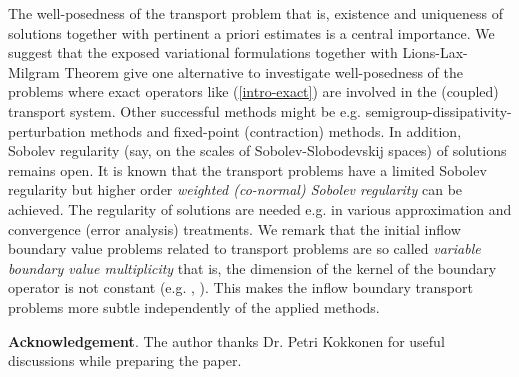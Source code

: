 \documentclass[a4paper,12pt,oneside,reqno]{amsart}
\theoremstyle{theorem}
\begin{document}
The well-posedness of the transport problem that is, existence and uniqueness of solutions together with pertinent a priori estimates is a central importance. 
We suggest that the exposed variational formulations together with Lions-Lax-Milgram Theorem give one alternative to investigate well-posedness of the problems where exact operators like (\ref{intro-exact}) are involved in the (coupled) transport system.  
Other successful  methods might be e.g. semigroup-dissipativity-perturbation  methods and fixed-point (contraction) methods. 
In addition,
Sobolev regularity (say, on the scales of Sobolev-Slobodevskij spaces) of solutions  remains  open.
It is known that the transport problems have a limited Sobolev regularity but higher order \emph{weighted (co-normal) Sobolev regularity} can be achieved.
The regularity of solutions are needed e.g. in various approximation and convergence (error analysis) treatments.
We remark that the initial inflow boundary value problems related to transport problems are so called \emph{variable boundary value multiplicity} that is, the dimension of the kernel of the boundary operator is not constant
(e.g. \cite{nishitani98}, \cite{rauch94}). This makes the inflow boundary transport problems
more subtle independently of the applied methods.

\vskip10mm
{\bf Acknowledgement}. The author thanks Dr. Petri Kokkonen for useful discussions while preparing the paper.
\end{document}
